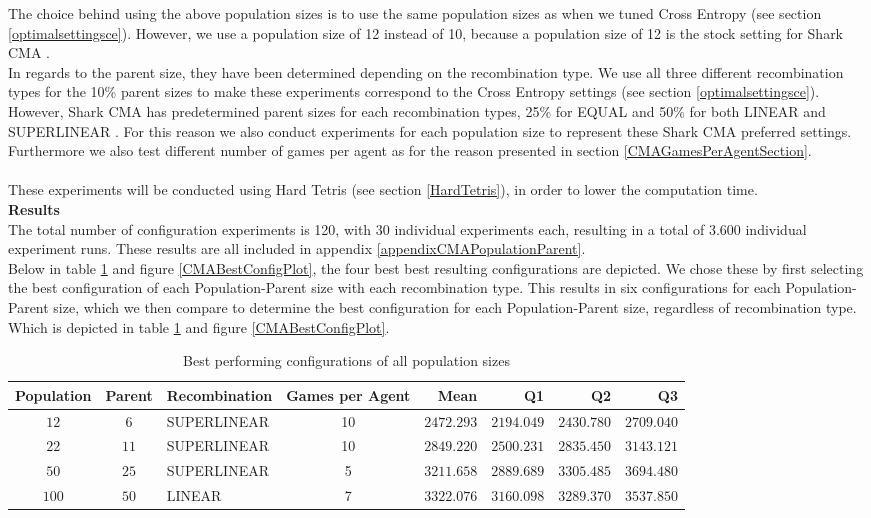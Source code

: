 The choice behind using the above population sizes is to use the same population sizes as
when we tuned Cross Entropy (see section \ref{optimalsettingsce}). However, we use a population
size of 12 instead of 10, because a population size of 12 is the stock setting for Shark CMA \citep{shark08}.\\
In regards to the parent size, they have been determined depending on the recombination type.
We use all three different recombination types for the 10\% parent sizes to make these experiments
correspond to the Cross Entropy settings (see section \ref{optimalsettingsce}). However, Shark CMA
has predetermined parent sizes for each recombination types, 25\% for EQUAL and 50\% for both
LINEAR and SUPERLINEAR \citep{shark08}. For this reason we also conduct experiments for each population
size to represent these Shark CMA preferred settings.
Furthermore we also test different number of games per agent as for the reason presented in section \ref{CMAGamesPerAgentSection}.\\\\
These experiments will be conducted using Hard Tetris (see section \ref{HardTetris}), in order
to lower the computation time.\\

\textbf{Results}\\
The total number of configuration experiments is 120, with 30 individual experiments each,
resulting in a total of 3.600 individual experiment runs. These results are all included in 
appendix \ref{appendixCMAPopulationParent}.\\
Below in table \ref{CMABestConfigTable} and figure \ref{CMABestConfigPlot}, the four best
best resulting configurations are depicted. We chose these by first selecting the best 
configuration of each Population-Parent size with each recombination type. This results in six
configurations for each Population-Parent size, which we then compare to determine the best
configuration for each Population-Parent size, regardless of recombination type. Which is depicted in table \ref{CMABestConfigTable} and figure \ref{CMABestConfigPlot}.

\begin{table}[H]
\centering
\small
\begin{tabular}{c c l c r r r r}
Population & Parent & Recombination & Games per Agent & Mean & Q1 & Q2 & Q3\\
\hline
$12$ & $6$  & SUPERLINEAR & 10 & $2472.293$ & $2194.049$ & $2430.780$ & $2709.040$\\
$22$ & $11$ & SUPERLINEAR & 10 & $2849.220$ & $2500.231$ & $2835.450$ & $3143.121$\\
$50$ & $25$ & SUPERLINEAR & 5  & $3211.658$ & $2889.689$ & $3305.485$ & $3694.480$\\
$100$ & $50$ & LINEAR     & 7  & $3322.076$ & $3160.098$ & $3289.370$ & $3537.850$
\end{tabular}
\caption{Best performing configurations of all population sizes \label{CMABestConfigTable}}
\end{table}

